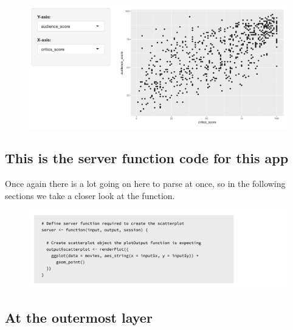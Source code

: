 \documentclass[
  letterpaper,
  DIV=11,
  numbers=noendperiod]{scrreprt}
\begin{document}
\begin{figure}

{\centering \includegraphics[width=1\textwidth,height=\textheight]{./images/app-selectinput-scatterplot.png}

}

\end{figure}

\hypertarget{this-is-the-server-function-code-for-this-app-1}{%
\subsection{This is the server function code for this
app}\label{this-is-the-server-function-code-for-this-app-1}}

Once again there is a lot going on here to parse at once, so in the
following sections we take a closer look at the function.

\begin{figure}

{\centering \includegraphics[width=1\textwidth,height=\textheight]{./images/server.png}

}

\end{figure}

\hypertarget{at-the-outermost-layer-1}{%
\subsection{At the outermost layer}\label{at-the-outermost-layer-1}}
\end{document}

